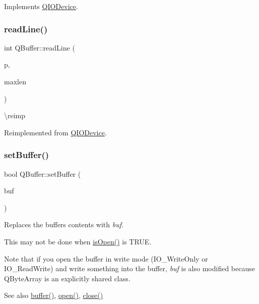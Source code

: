 Implements \mbox{\hyperlink{class_q_i_o_device_a71f10647e4bd98141f45362b9a06983a}{Q\+I\+O\+Device}}.

\mbox{\label{class_q_buffer_adcbf115b0d36683e6da2d3baa367382d}} 
\subsubsection{\texorpdfstring{readLine()}{readLine()}}
{\footnotesize\ttfamily int Q\+Buffer\+::read\+Line (\begin{DoxyParamCaption}\item[{char $\ast$}]{p,  }\item[{uint}]{maxlen }\end{DoxyParamCaption})\hspace{0.3cm}{\ttfamily [virtual]}}

\textbackslash{}reimp 

Reimplemented from \mbox{\hyperlink{class_q_i_o_device_a4dc865ffcb5b7896ff8f9a1d828e4c0e}{Q\+I\+O\+Device}}.

\mbox{\label{class_q_buffer_ad4c608788c2730ca60295488f75da423}} 
\subsubsection{\texorpdfstring{setBuffer()}{setBuffer()}}
{\footnotesize\ttfamily bool Q\+Buffer\+::set\+Buffer (\begin{DoxyParamCaption}\item[{\mbox{\hyperlink{class_q_array}{Q\+Byte\+Array}}}]{buf }\end{DoxyParamCaption})}

Replaces the buffer\textquotesingle{}s contents with {\itshape buf}.

This may not be done when \mbox{\hyperlink{class_q_i_o_device_a291d97cdb38c1cd261bfbaa67a9d3923}{is\+Open()}} is T\+R\+UE.

Note that if you open the buffer in write mode ({\ttfamily I\+O\+\_\+\+Write\+Only} or I\+O\+\_\+\+Read\+Write) and write something into the buffer, {\itshape buf} is also modified because Q\+Byte\+Array is an explicitly shared class.

\begin{DoxySeeAlso}{See also}
\mbox{\hyperlink{class_q_buffer_a4f369e95bc73a6141f1616824ea79470}{buffer()}}, \mbox{\hyperlink{class_q_buffer_aa3ceff2217a13a570e0dcec157b23b18}{open()}}, \mbox{\hyperlink{class_q_buffer_affd0b382476516b0d4e3adfaf27c0247}{close()}} 
\end{DoxySeeAlso}
\mbox{\label{class_q_buffer_aa064f4e430cdd1babd400982881012a8}} 
